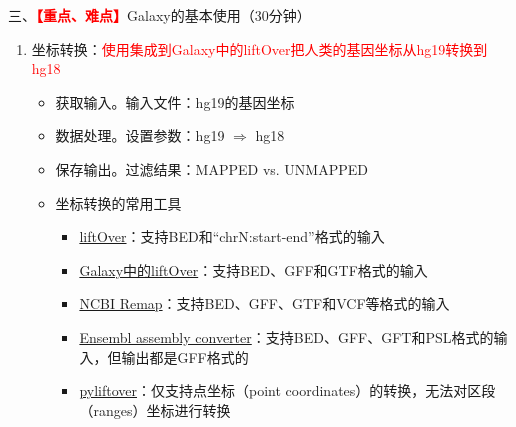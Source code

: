\documentclass{TIJMUjiaoanLL}
\begin{document}
\vspace*{0.2cm}
\noindent
三、\textcolor{red}{\textbf{【重点、难点】}}Galaxy的基本使用（30分钟）
\begin{enumerate}
  \item 坐标转换：\textcolor{red}{使用集成到Galaxy中的liftOver把人类的基因坐标从hg19转换到hg18}
    \begin{itemize}
      \item 获取输入。输入文件：hg19的基因坐标
      \item 数据处理。设置参数：hg19 $\Rightarrow$ hg18
      \item 保存输出。过滤结果：MAPPED vs. UNMAPPED
      \item 坐标转换的常用工具
        \begin{itemize}
          \item \href{http://genome.ucsc.edu/cgi-bin/hgLiftOver}{liftOver}：支持BED和“chrN:start-end”格式的输入
          \item \href{https://usegalaxy.org/}{Galaxy中的liftOver}：支持BED、GFF和GTF格式的输入
          \item \href{http://www.ncbi.nlm.nih.gov/genome/tools/remap}{NCBI Remap}：支持BED、GFF、GTF和VCF等格式的输入
          \item \href{http://asia.ensembl.org/Homo\_sapiens/UserData/SelectFeatures}{Ensembl assembly converter}：支持BED、GFF、GFT和PSL格式的输入，但输出都是GFF格式的
          \item \href{https://pypi.python.org/pypi/pyliftover}{pyliftover}：仅支持点坐标（point coordinates）的转换，无法对区段（ranges）坐标进行转换
        \end{itemize}
    \end{itemize}


\otherTail
\newpage
\otherHeader



\end{enumerate}
\end{document}

